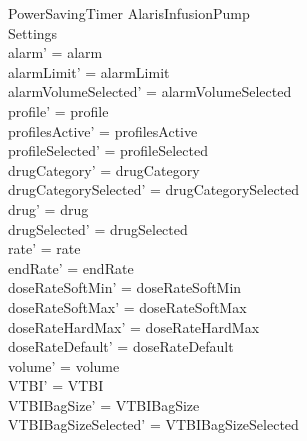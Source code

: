 \begin{schema}{PowerSavingTimer}
	\Delta AlarisInfusionPump\\
	Settings\\
	\where
	\pagebreak
	alarm' = alarm\\
	alarmLimit' = alarmLimit\\
	alarmVolumeSelected' = alarmVolumeSelected\\
	profile' = profile\\
	profilesActive' = profilesActive\\  
	  profileSelected' = profileSelected\\
	drugCategory' = drugCategory\\ drugCategorySelected' = drugCategorySelected\\
	drug' = drug\\ drugSelected' = drugSelected\\
	rate' = rate\\
	endRate' = endRate\\
	doseRateSoftMin' = doseRateSoftMin\\
	doseRateSoftMax' = doseRateSoftMax\\
	doseRateHardMax' = doseRateHardMax\\
	doseRateDefault' = doseRateDefault\\
	volume' = volume\\
	VTBI' = VTBI\\
	VTBIBagSize' = VTBIBagSize\\ VTBIBagSizeSelected' = VTBIBagSizeSelected\\

\end{schema}
